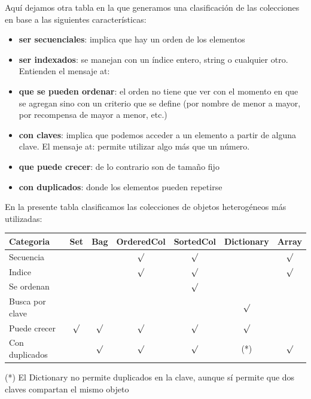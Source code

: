 \documentclass[a4paper,12pt]{book}
\begin{document}
Aquí dejamos otra tabla en la que generamos una clasificación de las colecciones en base a las siguientes
características:

\begin{itemize}
 \item \textbf{ser secuenciales}: implica que hay un orden de los elementos
 \item \textbf{ser indexados}: se manejan con un índice entero, string o cualquier otro. Entienden el mensaje at:
 \item \textbf{que se pueden ordenar}: el orden no tiene que ver con el momento en que se agregan
 sino con un criterio que se define (por nombre de menor a mayor, por recompensa de mayor a menor, etc.)
 \item \textbf{con claves}: implica que podemos acceder a un elemento a partir de alguna clave. El mensaje
 at: permite utilizar algo más que un número.
 \item \textbf{que puede crecer}: de lo contrario son de tamaño fijo
 \item \textbf{con duplicados}: donde los elementos pueden repetirse
\end{itemize}

En la presente tabla clasificamos las colecciones de objetos heterogéneos más utilizadas:
\newline

\begin{tabular}{|l|c|c|c|c|c|c|}
\hline
\cellcolor[gray]{0.8}
Categoria & \cellcolor[gray]{0.8} Set & \cellcolor[gray]{0.8} Bag & \cellcolor[gray]{0.8} OrderedCol
& \cellcolor[gray]{0.8} SortedCol & \cellcolor[gray]{0.8} Dictionary
& \cellcolor[gray]{0.8} Array \\
\hline
Secuencia & & & $\surd$ & $\surd$ & & $\surd$ \\
\hline
Indice & & & $\surd$ & $\surd$ & & $\surd$ \\
\hline
Se ordenan & & & & $\surd$ & & \\
\hline
Busca por clave & & & & & $\surd$ & \\
\hline
Puede crecer & $\surd$ & $\surd$ & $\surd$ & $\surd$ & $\surd$ & \\
\hline
Con duplicados & & $\surd$ & $\surd$ & $\surd$ & (*) & $\surd$ \\
\hline
\end{tabular}
\newline\newline

(*) El Dictionary no permite duplicados en la clave, aunque sí permite que dos claves compartan el mismo objeto
\end{document}
